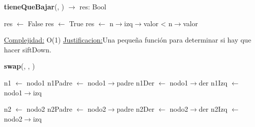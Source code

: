 \begin{Representacion}
\begin{Algoritmos}
\begin{algorithm}[H]{\textbf{tieneQueBajar}(, ) $\to$ res: Bool}
	\begin{algorithmic}[1]
	
			\State res $\gets$ False
		\Else
				\State res $\gets$ True
			\Else
				\State res $\gets$ n$\to$izq$\to$valor < n$\to$valor	
			\EndIf
		\EndIf

		\medskip
		\Statex \underline{Complejidad:} O(1)
			\Statex \underline{Justificacion:}Una pequeña función para determinar si hay que hacer siftDown. 
	\end{algorithmic}
\end{algorithm}

\begin{algorithm}[H]{\textbf{swap}(, , )}
	\begin{algorithmic}[1]
		
		\State n1 $\gets$ nodo1
		\State n1Padre $\gets$ nodo1$\to$padre
		\State n1Der $\gets$ nodo1$\to$der
		\State n1Izq $\gets$ nodo1$\to$izq
		
		\State n2 $\gets$ nodo2
		\State n2Padre $\gets$ nodo2$\to$padre
		\State n2Der $\gets$ nodo2$\to$der
		\State n2Izq $\gets$ nodo2$\to$izq
		

\end{algorithmic}
\end{algorithm}
\end{Algoritmos}
\end{Representacion}
